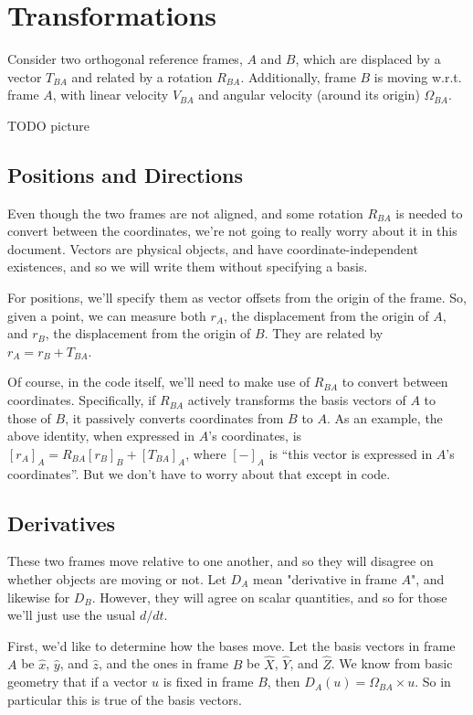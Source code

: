 \documentclass{article}
\begin{document}
\section*{Transformations}

Consider two orthogonal reference frames, $A$ and $B$, which are displaced by a vector $T_{BA}$ and related by a rotation $R_{BA}$. Additionally, frame $B$ is moving w.r.t. frame $A$, with linear velocity $V_{BA}$ and angular velocity (around its origin) $\Omega_{BA}$.

TODO picture

\subsection*{Positions and Directions}

Even though the two frames are not aligned, and some rotation $R_{BA}$ is needed to convert between the coordinates, we're not going to really worry about it in this document. Vectors are physical objects, and have coordinate-independent existences, and so we will write them without specifying a basis.

For positions, we'll specify them as vector offsets from the origin of the frame. So, given a point, we can measure both $r_A$, the displacement from the origin of $A$, and $r_B$, the displacement from the origin of $B$. They are related by $r_A = r_B + T_{BA}$.

Of course, in the code itself, we'll need to make use of $R_{BA}$ to convert between coordinates. Specifically, if $R_{BA}$ actively transforms the basis vectors of $A$ to those of $B$, it passively converts coordinates from $B$ to $A$. As an example, the above identity, when expressed in $A$'s coordinates, is $[r_A]_A = R_{BA} [r_B]_B + [T_{BA}]_A$, where $[-]_A$ is ``this vector is expressed in $A$'s coordinates''. But we don't have to worry about that except in code.

\subsection*{Derivatives}

These two frames move relative to one another, and so they will disagree on whether objects are moving or not. Let $D_A$ mean "derivative in frame $A$", and likewise for $D_B$. However, they will agree on scalar quantities, and so for those we'll just use the usual $d/dt$.

First, we'd like to determine how the bases move. Let the basis vectors in frame $A$ be $\hat x$, $\hat y$, and $\hat z$, and the ones in frame $B$ be $\hat X$, $\hat Y$, and $\hat Z$. We know from basic geometry that if a vector $u$ is fixed in frame $B$, then $D_A (u) = \Omega_{BA} \times u$. So in particular this is true of the basis vectors.
\end{document}
